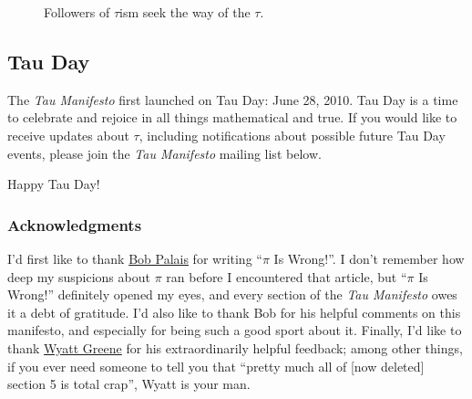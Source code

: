\documentclass{article}
\begin{document}
\begin{figure}
\begin{center}
\end{center}
\caption{Followers of $\tau$ism seek the way of the $\tau$.\label{fig:tauism}}
\end{figure}

  \subsection{Tau Day} %
  \label{sec:tau_day}
  

The \emph{Tau Manifesto} first launched on Tau Day: June 28, 2010. Tau Day is a time to celebrate and rejoice in all things mathematical and true. If you would like to receive updates about $\tau$, including notifications about possible future Tau Day events, please join the \emph{Tau Manifesto} mailing list below.

Happy Tau Day!







  \subsubsection{Acknowledgments} %
  \label{sec:acknowledgments}
    
I'd first like to thank \href{http://www.math.utah.edu/~palais/}{Bob Palais} for writing ``$\pi$ Is Wrong!''. I don't remember how deep my suspicions about $\pi$ ran before I encountered that article, but ``$\pi$ Is Wrong!'' definitely opened my eyes, and every section of the \emph{Tau Manifesto} owes it a debt of gratitude. I'd also like to thank Bob for his helpful comments on this manifesto, and especially for being such a good sport about it. Finally, I'd like to thank \href{http://techiferous.com/}{Wyatt Greene} for his extraordinarily helpful feedback; among other things, if you ever need someone to tell you that ``pretty much all of [now deleted] section 5 is total crap'', Wyatt is your man.
\end{document}
